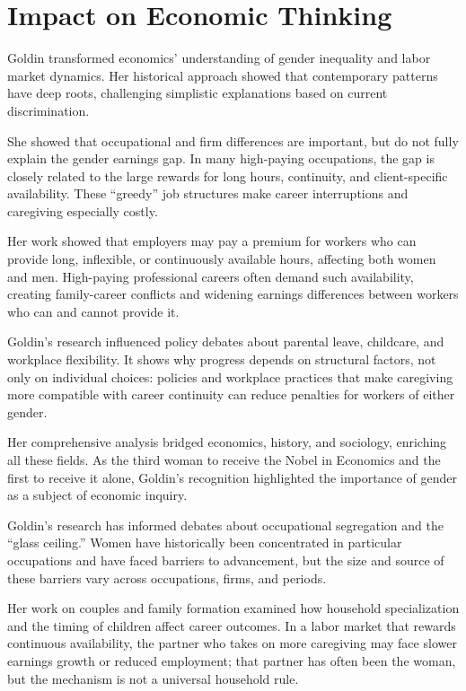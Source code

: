 \section{Impact on Economic Thinking}
Goldin transformed economics' understanding of gender inequality and labor
market dynamics. Her historical approach showed that contemporary patterns
have deep roots, challenging simplistic explanations based on current
discrimination.

She showed that occupational and firm differences are important, but do not
fully explain the gender earnings gap. In many high-paying occupations, the gap
is closely related to the large rewards for long hours, continuity, and
client-specific availability. These ``greedy'' job structures make career
interruptions and caregiving especially costly.

Her work showed that employers may pay a premium for workers who can provide
long, inflexible, or continuously available hours, affecting both women and men.
High-paying professional careers often demand such availability, creating
family-career conflicts and widening earnings differences between workers who
can and cannot provide it.

Goldin's research influenced policy debates about parental leave, childcare,
and workplace flexibility. It shows why progress depends on structural factors,
not only on individual choices: policies and workplace practices that make
caregiving more compatible with career continuity can reduce penalties for
workers of either gender.

Her comprehensive analysis bridged economics, history, and sociology, enriching
all these fields. As the third woman to receive the Nobel in Economics and the
first to receive it alone, Goldin's recognition highlighted the importance of
gender as a subject of economic inquiry.

Goldin's research has informed debates about occupational segregation and the
``glass ceiling.'' Women have historically been concentrated in particular
occupations and have faced barriers to advancement, but the size and source of
these barriers vary across occupations, firms, and periods.

Her work on couples and family formation examined how household specialization
and the timing of children affect career outcomes. In a labor market that
rewards continuous availability, the partner who takes on more caregiving may
face slower earnings growth or reduced employment; that partner has often been
the woman, but the mechanism is not a universal household rule.

